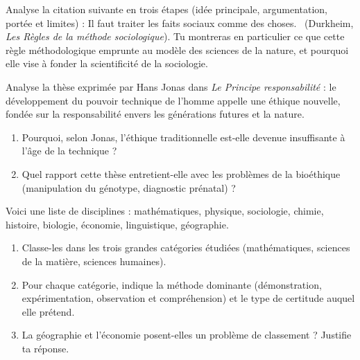 \documentclass[11pt]{article}
\newcounter{popsec}
\newcounter{popsub}
\newcommand{\courssub}[1]{%
  \stepcounter{popsub}%
  \par\vspace{9pt}\noindent{\popxbold\fontsize{11.5}{13}\selectfont\color{popink}{\color{poporange}\thepopsec.\thepopsub}\hspace{6pt}#1}\par\nopagebreak\vspace{4pt}
}
\begin{document}
\begin{exercice}
Analyse la citation suivante en trois étapes (idée principale, argumentation, portée et limites) :
\guillemotleft Il faut traiter les faits sociaux comme des choses. \guillemotright\ (Durkheim, \emph{Les Règles de la méthode sociologique}).
Tu montreras en particulier ce que cette règle méthodologique emprunte au modèle des sciences de la nature, et pourquoi elle vise à fonder la scientificité de la sociologie.
\end{exercice}

\begin{exercice}
Analyse la thèse exprimée par Hans Jonas dans \emph{Le Principe responsabilité} : le développement du pouvoir technique de l'homme appelle une éthique nouvelle, fondée sur la responsabilité envers les générations futures et la nature.
\begin{enumerate}
\item Pourquoi, selon Jonas, l'éthique traditionnelle est-elle devenue insuffisante à l'âge de la technique ?
\item Quel rapport cette thèse entretient-elle avec les problèmes de la bioéthique (manipulation du génotype, diagnostic prénatal) ?
\end{enumerate}
\end{exercice}

\begin{exercice}
Voici une liste de disciplines : mathématiques, physique, sociologie, chimie, histoire, biologie, économie, linguistique, géographie.
\begin{enumerate}
\item Classe-les dans les trois grandes catégories étudiées (mathématiques, sciences de la matière, sciences humaines).
\item Pour chaque catégorie, indique la méthode dominante (démonstration, expérimentation, observation et compréhension) et le type de certitude auquel elle prétend.
\item La géographie et l'économie posent-elles un problème de classement ? Justifie ta réponse.
\end{enumerate}
\end{exercice}

\courssub{Je me prépare au Bac}
\end{document}
